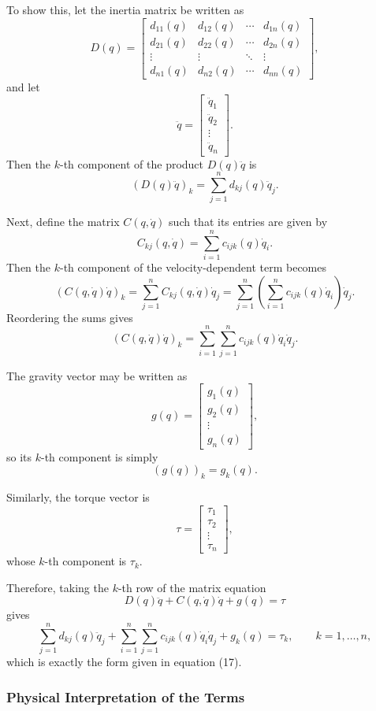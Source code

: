 \documentclass{article}
\begin{document}
To show this, let the inertia matrix be written as
\[
D(q)=
\begin{bmatrix}
d_{11}(q) & d_{12}(q) & \cdots & d_{1n}(q)\\
d_{21}(q) & d_{22}(q) & \cdots & d_{2n}(q)\\
\vdots & \vdots & \ddots & \vdots\\
d_{n1}(q) & d_{n2}(q) & \cdots & d_{nn}(q)
\end{bmatrix},
\]
and let
\[
\ddot q=
\begin{bmatrix}
\ddot q_1\\
\ddot q_2\\
\vdots\\
\ddot q_n
\end{bmatrix}.
\]
Then the \(k\)-th component of the product \(D(q)\ddot q\) is
\[
\left(D(q)\ddot q\right)_k
=
\sum_{j=1}^{n} d_{kj}(q)\ddot q_j.
\]

Next, define the matrix \(C(q,\dot q)\) such that its entries are given by
\[
C_{kj}(q,\dot q)=\sum_{i=1}^{n} c_{ijk}(q)\dot q_i.
\]
Then the \(k\)-th component of the velocity-dependent term becomes
\[
\left(C(q,\dot q)\dot q\right)_k
=
\sum_{j=1}^{n} C_{kj}(q,\dot q)\dot q_j
=
\sum_{j=1}^{n}\left(\sum_{i=1}^{n} c_{ijk}(q)\dot q_i\right)\dot q_j.
\]
Reordering the sums gives
\[
\left(C(q,\dot q)\dot q\right)_k
=
\sum_{i=1}^{n}\sum_{j=1}^{n} c_{ijk}(q)\dot q_i\dot q_j.
\]

The gravity vector may be written as
\[
g(q)=
\begin{bmatrix}
g_1(q)\\
g_2(q)\\
\vdots\\
g_n(q)
\end{bmatrix},
\]
so its \(k\)-th component is simply
\[
(g(q))_k=g_k(q).
\]

Similarly, the torque vector is
\[
\tau=
\begin{bmatrix}
\tau_1\\
\tau_2\\
\vdots\\
\tau_n
\end{bmatrix},
\]
whose \(k\)-th component is \(\tau_k\).

Therefore, taking the \(k\)-th row of the matrix equation
\[
D(q)\ddot q + C(q,\dot q)\dot q + g(q)=\tau
\]
gives
\[
\sum_{j=1}^{n} d_{kj}(q)\ddot q_j
+
\sum_{i=1}^{n}\sum_{j=1}^{n} c_{ijk}(q)\dot q_i\dot q_j
+
g_k(q)
=
\tau_k,
\qquad k=1,\dots,n,
\]
which is exactly the form given in equation (17).

\subsubsection*{Physical Interpretation of the Terms}
\end{document}
